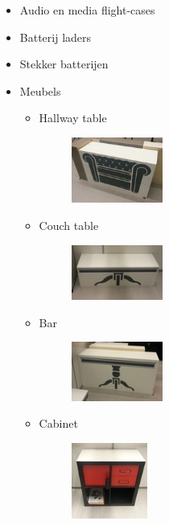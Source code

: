 \documentclass[a4paper,10pt]{article}
\numberwithin{equation}{section}
\numberwithin{figure}{section}
\numberwithin{table}{section}
\begin{document}
\begin{itemize}
	\item Audio en media flight-cases
	\item Batterij laders
	\item Stekker batterijen
	\item Meubels
        \begin{multicols}{2}
		\begin{itemize}
			\item Hallway table
			
				\begin{figure}[H]
					\centering
					\includegraphics[width=0.3\textwidth]{Figures/hallwaytable}
				\end{figure}
			
			\item Couch table
				\begin{figure}[H]
					\centering
					\includegraphics[width=0.3\textwidth]{Figures/couchtable}
				\end{figure}			
			
			\item Bar
				\begin{figure}[H]
					\centering
					\includegraphics[width=0.3\textwidth]{Figures/bar}
				\end{figure}			
			
			\item Cabinet
					\begin{figure}[H]
						\centering
						\includegraphics[width=0.25\textwidth]{Figures/cabinet}
					\end{figure}	
			

\end{itemize}
\end{multicols}
\end{itemize}
\end{document}
